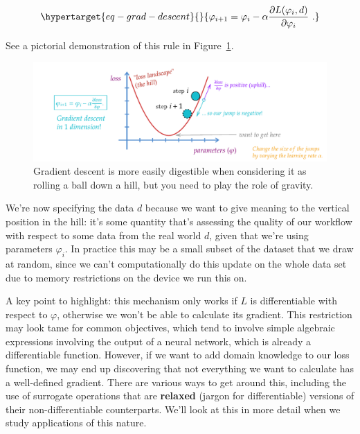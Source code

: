 \documentclass[
  11pt,
  numbers=noendperiod]{book}
\begin{document}
\begin{equation}\protect\hypertarget{eq-grad-descent}{}{
\varphi_{i+1} = \varphi_i - \alpha \frac{\partial L(\varphi_i, d)}{\partial \varphi_i}~.
}\label{eq-grad-descent-opt}\end{equation}

See a pictorial demonstration of this rule in
Figure~\ref{fig-ball-rolling}.

\begin{figure}

{\centering \includegraphics{./images/gdesc3.pdf}

}

\caption{\label{fig-ball-rolling}Gradient descent is more easily
digestible when considering it as rolling a ball down a hill, but you
need to play the role of gravity.}

\end{figure}

We're now specifying the data \(d\) because we want to give meaning to
the vertical position in the hill: it's some quantity that's assessing
the quality of our workflow with respect to some data from the real
world \(d\), given that we're using parameters \(\varphi_i\). In
practice this may be a small subset of the dataset that we draw at
random, since we can't computationally do this update on the whole data
set due to memory restrictions on the device we run this on.

A key point to highlight: this mechanism only works if \(L\) is
differentiable with respect to \(\varphi\), otherwise we won't be able
to calculate its gradient. This restriction may look tame for common
objectives, which tend to involve simple algebraic expressions involving
the output of a neural network, which is already a differentiable
function. However, if we want to add domain knowledge to our loss
function, we may end up discovering that not everything we want to
calculate has a well-defined gradient. There are various ways to get
around this, including the use of surrogate operations that are
\textbf{relaxed} (jargon for differentiable) versions of their
non-differentiable counterparts. We'll look at this in more detail when
we study applications of this nature.
\end{document}
